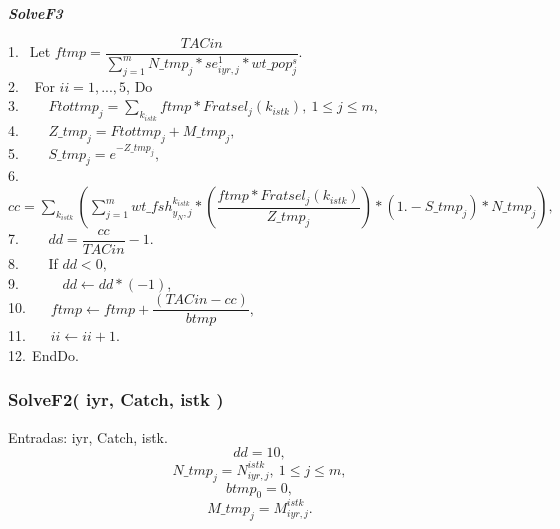 \documentclass{article}
\begin{document}
 \begin{algorithm}[H]
	\caption{{\bf \textit{SolveF3}}}
	1. $\  \ $Let $ftmp=\dfrac{TACin}{\sum_{j=1}^mN\_tmp_j*se^1_{iyr,j}*wt\_pop^s_j}$. \\
    2. $\  \ $ For $ii=1,...,5$, Do \\
	3. $\  \ \quad$   $Ftottmp_j= \sum_{k_{istk}}ftmp*Fratsel_j(k_{istk}), \ 1\leq j \leq m,$\\
	4. $\  \ \quad$  $Z\_tmp_j=Ftottmp_j+M\_tmp_j,$\\
	5. $\  \ \quad$ $S\_tmp_j=e^{-Z\_tmp_j},$\\
    6. $\  \ \quad$ $cc=\sum_{k_{istk}}\left(\sum_{j=1}^m wt\_fsh^{k_{istk}}_{y_N,j}*\left(\dfrac{ftmp*Fratsel_j(k_{istk})}{Z\_tmp_j}\right)*(1.-S\_tmp_j)*N\_tmp_j\right),$\\
    7. $\  \ \quad$ $dd=\dfrac{cc}{TACin}-1.$\\
    8. $\  \ \quad$  If  $dd<0,$\\
    9. $\  \ \qquad$   $dd \leftarrow dd * (-1)$,\\
    10.$\  \ \quad$   $ftmp \leftarrow ftmp + \dfrac{(TACin-cc)}{btmp},$\\
    11.$\  \ \quad$   $ii \leftarrow ii+1.$\\
    12.$\  \ $EndDo.
    
\end{algorithm}








\subsubsection{SolveF2( iyr, Catch, istk )}
Entradas: iyr, Catch, istk.
\begin{equation}
    dd=10,
\end{equation}
\begin{equation}
    N\_tmp_j = N^{istk}_{iyr,j}, \ 1\leq j \leq m,
\end{equation}
\begin{equation}
    btmp_0=0,
\end{equation}
\begin{equation}
    M\_tmp_j=M^{istk}_{iyr,j}.
\end{equation}
\end{document}

